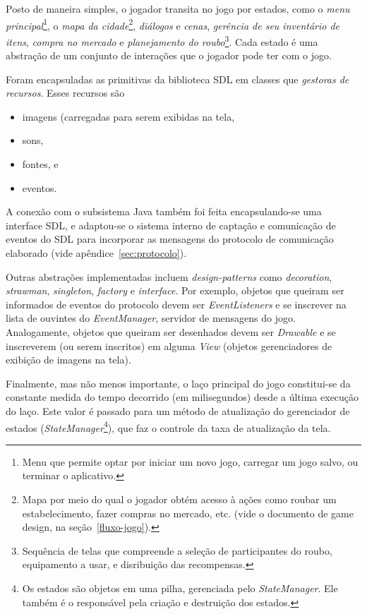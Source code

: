 Posto de maneira simples, o jogador transita no jogo por estados, como
o \emph{menu principal}\footnote{Menu que permite optar por iniciar um
  novo jogo, carregar um jogo salvo, ou terminar o aplicativo.}, o
\emph{mapa da cidade}\footnote{Mapa por meio do qual o jogador obtém
  acesso à ações como roubar um estabelecimento, fazer compras no
  mercado, etc. (vide o documento de game design, na
  seção~\ref{fluxo-jogo}).}, \emph{diálogos} e \emph{cenas}, 
\emph{gerência de seu inventário de itens}, \emph{compra no mercado} e
\emph{planejamento do roubo}\footnote{Sequência de telas que
  compreende a seleção de participantes do roubo, equipamento a usar,
  e disribuição das recompensas.}. Cada estado é uma abstração de um
conjunto de interações que o jogador pode ter com o jogo.

Foram encapsuladas as primitivas da biblioteca SDL em classes que
\emph{gestoras de recursos}. Esses recursos são
\begin{itemize}
\item imagens (carregadas para serem exibidas na tela,
\item sons,
\item fontes, e
\item eventos.
\end{itemize}

A conexão com o subsistema Java também foi feita encapsulando-se uma
interface SDL, e adaptou-se o sistema interno de captação e
comunicação de eventos do SDL para incorporar as mensagens do
protocolo de comunicação elaborado (vide apêndice~\ref{sec:protocolo}).

Outras abstrações implementadas incluem \emph{design-patterns} como
\emph{decoration}, \emph{strawman}, \emph{singleton}, \emph{factory} e
\emph{interface}. Por exemplo, objetos que queiram ser informados de
eventos do protocolo devem ser \emph{EventListeners} e se inscrever na
lista de ouvintes do \emph{EventManager}, servidor de mensagens do
jogo. Analogamente, objetos que queiram ser desenhados devem ser
\emph{Drawable} e se inscreverem (ou serem inscritos) em alguma
\emph{View} (objetos gerenciadores de exibição de imagens na
tela).

Finalmente, mas não menos importante, o laço principal do jogo
constitui-se da constante medida do tempo decorrido (em milisegundos)
desde a última execução do laço. Este valor é passado para um método
de atualização do gerenciador de estados
(\emph{StateManager}\footnote{Os estados são objetos em uma pilha,
  gerenciada pelo \emph{StateManager}. Ele também é o responsável pela
criação e destruição dos estados.}), que faz o controle da taxa
de atualização da tela.




